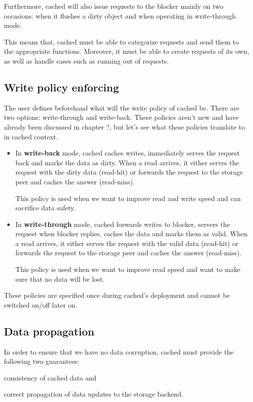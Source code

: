 Furthermore, cached will also issue requests to the blocker mainly on two 
occasions: when it flushes a dirty object and when operating in write-through 
mode.

This means that, cached must be able to categorize requests and send them to 
the appropriate functions. Moreover, it must be able to create requests of its 
own, as well as handle cases such as running out of requests.

\subsection{Write policy enforcing}\label{sec:cached-wcp-design}

The user defines beforehand what will the write policy of cached be. There are 
two options: write-through and write-back. These policies aren't new and have 
already been discussed in chapter ?, but let's see what these policies 
translate to in cached context.

\begin{itemize}
	\item
		In \textbf{write-back} mode, cached caches writes, immediately 
		serves the request back and marks the data as dirty. When a read 
		arrives, it either serves the request with the dirty data 
		(read-hit) or forwards the request to the storage peer and 
		caches the answer (read-miss).

		This policy is used when we want to improve read and write speed 
		and can sacrifice data safety.
	\item
		In \textbf{write-through} mode, cached forwards writes to 
		blocker, servers the request when blocker replies, caches the 
		data and marks them as valid.  When a read arrives, it either 
		serves the request with the valid data (read-hit) or forwards 
		the request to the storage peer and caches the answer 
		(read-miss).

		This policy is used when we want to improve read speed and want 
		to make sure that no data will be lost.
\end{itemize}	

These policies are specified once during cached's deployment and cannot be 
switched on/off later on.

\subsection{Data propagation}

In order to ensure that we have no data corruption, cached must provide the 
following two guarantees:
\begin{inparaenum}[i)]
\item consistency of cached data and
\item correct propagation of data updates to the storage backend.
\end{inparaenum}


